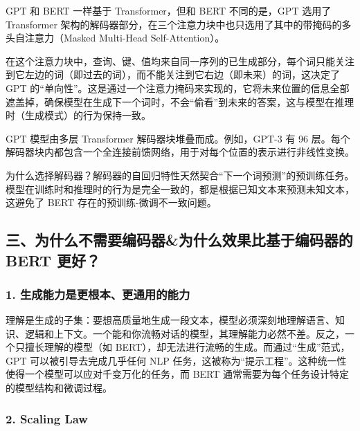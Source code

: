 GPT 和 BERT 一样基于 Transformer，但和 BERT 不同的是，GPT 选用了 Transformer 架构的解码器部分，在三个注意力块中也只选用了其中的带掩码的多头自注意力（Masked Multi-Head Self-Attention）。

在这个注意力块中，查询、键、值均来自同一序列的已生成部分，每个词只能关注到它左边的词（即过去的词），而不能关注到它右边（即未来）的词，这决定了 GPT 的``单向性''。这是通过一个注意力掩码来实现的，它将未来位置的信息全部遮盖掉，确保模型在生成下一个词时，不会``偷看''到未来的答案，这与模型在推理时（生成模式）的行为保持一致。

GPT 模型由多层 Transformer 解码器块堆叠而成。例如，GPT-3 有 96 层。每个解码器块内都包含一个全连接前馈网络，用于对每个位置的表示进行非线性变换。

为什么选择解码器？解码器的自回归特性天然契合``下一个词预测''的预训练任务。模型在训练时和推理时的行为是完全一致的，都是根据已知文本来预测未知文本，这避免了 BERT 存在的预训练-微调不一致问题。

\hypertarget{ux4e09ux4e3aux4ec0ux4e48ux4e0dux9700ux8981ux7f16ux7801ux5668ux4e3aux4ec0ux4e48ux6548ux679cux6bd4ux57faux4e8eux7f16ux7801ux5668ux7684-bert-ux66f4ux597d}{%
\subsection{三、为什么不需要编码器\&为什么效果比基于编码器的 BERT 更好？}\label{ux4e09ux4e3aux4ec0ux4e48ux4e0dux9700ux8981ux7f16ux7801ux5668ux4e3aux4ec0ux4e48ux6548ux679cux6bd4ux57faux4e8eux7f16ux7801ux5668ux7684-bert-ux66f4ux597d}}

\hypertarget{ux751fux6210ux80fdux529bux662fux66f4ux6839ux672cux66f4ux901aux7528ux7684ux80fdux529b}{%
\subsubsection{1. 生成能力是更根本、更通用的能力}\label{ux751fux6210ux80fdux529bux662fux66f4ux6839ux672cux66f4ux901aux7528ux7684ux80fdux529b}}

理解是生成的子集：要想高质量地生成一段文本，模型必须深刻地理解语言、知识、逻辑和上下文。一个能和你流畅对话的模型，其理解能力必然不差。反之，一个只擅长理解的模型（如 BERT），却无法进行流畅的生成。而通过``生成''范式，GPT 可以被引导去完成几乎任何 NLP 任务，这被称为``提示工程''。这种统一性使得一个模型可以应对千变万化的任务，而 BERT 通常需要为每个任务设计特定的模型结构和微调过程。

\hypertarget{scaling-law}{%
\subsubsection{2. Scaling Law}\label{scaling-law}}

